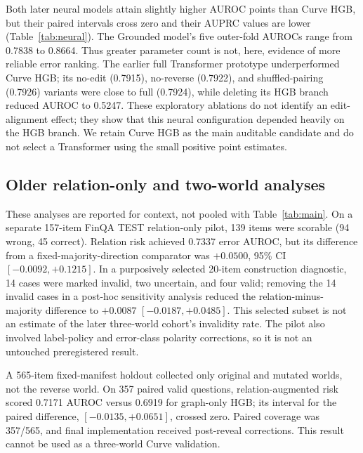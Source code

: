\documentclass[11pt]{article}
\begin{document}
Both later neural models attain slightly higher AUROC points than Curve HGB, but their paired intervals cross zero and their AUPRC values are lower (Table~\ref{tab:neural}). The Grounded model's five outer-fold AUROCs range from 0.7838 to 0.8664. Thus greater parameter count is not, here, evidence of more reliable error ranking. The earlier full Transformer prototype underperformed Curve HGB; its no-edit (0.7915), no-reverse (0.7922), and shuffled-pairing (0.7926) variants were close to full (0.7924), while deleting its HGB branch reduced AUROC to 0.5247. These exploratory ablations do not identify an edit-alignment effect; they show that this neural configuration depended heavily on the HGB branch. We retain Curve HGB as the main auditable candidate and do not select a Transformer using the small positive point estimates.

\subsection{Older relation-only and two-world analyses}
These analyses are reported for context, not pooled with Table~\ref{tab:main}. On a separate 157-item FinQA TEST relation-only pilot, 139 items were scorable (94 wrong, 45 correct). Relation risk achieved 0.7337 error AUROC, but its difference from a fixed-majority-direction comparator was $+0.0500$, 95\% CI $[-0.0092,+0.1215]$. In a purposively selected 20-item construction diagnostic, 14 cases were marked invalid, two uncertain, and four valid; removing the 14 invalid cases in a post-hoc sensitivity analysis reduced the relation-minus-majority difference to $+0.0087$ $[-0.0187,+0.0485]$. This selected subset is not an estimate of the later three-world cohort's invalidity rate. The pilot also involved label-policy and error-class polarity corrections, so it is not an untouched preregistered result.

A 565-item fixed-manifest holdout collected only original and mutated worlds, not the reverse world. On 357 paired valid questions, relation-augmented risk scored 0.7171 AUROC versus 0.6919 for graph-only HGB; its interval for the paired difference, $[-0.0135,+0.0651]$, crossed zero. Paired coverage was 357/565, and final implementation received post-reveal corrections. This result cannot be used as a three-world Curve validation.
\end{document}
